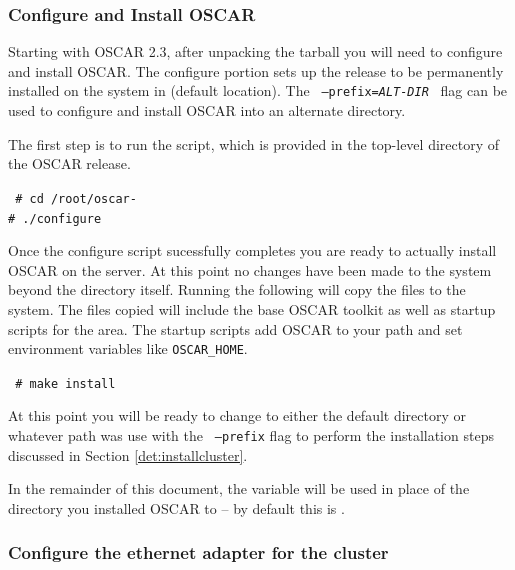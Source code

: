
\subsubsection{Configure and Install OSCAR}
\label{det:configure-install}

Starting with OSCAR 2.3, after unpacking the tarball you will need
to configure and install OSCAR.  The configure portion sets up the
release to be permanently installed on the system in
 (default location).  The {\tt
--prefix=\emph{ALT-DIR}} $\,$ flag can be used to configure and
install OSCAR into an alternate directory.

The first step is to run the  script, which is provided in
the top-level directory of the OSCAR release.

  \vspace{11pt} {\tt
          \# cd /root/oscar-\oscarversion \\
  \indent \# ./configure }  \vspace{11pt}

Once the configure script sucessfully completes you are ready to actually
install OSCAR on the server.  At this point no changes have been made to
the system beyond the  directory itself.  Running
the following will copy the files to the system.  The files copied will
include the base OSCAR toolkit as well as startup scripts for the
 area.  The startup scripts add OSCAR to your path and set
environment variables like {\tt OSCAR\_HOME}.

  \vspace{11pt} {\tt
  \indent \# make install} \vspace{11pt}


At this point you will be ready to change to either the default
 directory or whatever path was use with the {\tt
--prefix} flag to perform the installation steps discussed in Section
\ref{det:installcluster}.

In the remainder of this document, the variable 
will be used in place of the directory you installed OSCAR to -- by
default this is .



\subsubsection{Configure the ethernet adapter for the cluster}
\label{det:serveradapter}

